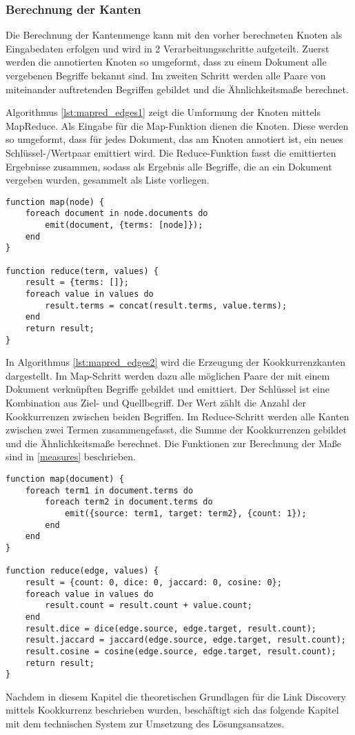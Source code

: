 \subsubsection{Berechnung der Kanten}

Die Berechnung der Kantenmenge kann mit den vorher berechneten Knoten als Eingabedaten erfolgen und wird in 2 Verarbeitungsschritte aufgeteilt. Zuerst werden die annotierten Knoten so umgeformt, dass zu einem Dokument alle vergebenen Begriffe bekannt sind. Im zweiten Schritt werden alle Paare von miteinander auftretenden Begriffen gebildet und die Ähnlichkeitsmaße berechnet.

Algorithmus \ref{lst:mapred_edges1} zeigt die Umformung der Knoten mittels MapReduce. Als Eingabe für die Map-Funktion dienen die Knoten. Diese werden so umgeformt, dass für jedes Dokument, das am Knoten annotiert ist, ein neues Schlüssel-/Wertpaar emittiert wird. Die Reduce-Funktion fasst die emittierten Ergebnisse zusammen, sodass als Ergebnis alle Begriffe, die an ein Dokument vergeben wurden, gesammelt als Liste vorliegen.

\begin{lstlisting}[language=pseudo, label={lst:mapred_edges1}, caption={Umformung der Knoten mit MapReduce}]
function map(node) {
    foreach document in node.documents do
        emit(document, {terms: [node]});
    end
}

function reduce(term, values) {
    result = {terms: []};
    foreach value in values do
        result.terms = concat(result.terms, value.terms);
    end
    return result;
}
\end{lstlisting}

In Algorithmus \ref{lst:mapred_edges2} wird die Erzeugung der Kookkurrenzkanten dargestellt. Im Map-Schritt werden dazu alle möglichen Paare der mit einem Dokument verknüpften Begriffe gebildet und emittiert. Der Schlüssel ist eine Kombination aus Ziel- und Quellbegriff. Der Wert zählt die Anzahl der Kookkurrenzen zwischen beiden Begriffen. Im Reduce-Schritt werden alle Kanten zwischen zwei Termen zusammengefasst, die Summe der Kookkurrenzen gebildet und die Ähnlichkeitsmaße berechnet. Die Funktionen zur Berechnung der Maße sind in \ref{measures} beschrieben.

\begin{lstlisting}[language=pseudo, label={lst:mapred_edges2}, caption={Kantenerzeugung mit MapReduce}]
function map(document) {
    foreach term1 in document.terms do
        foreach term2 in document.terms do
            emit({source: term1, target: term2}, {count: 1});
        end
    end
}

function reduce(edge, values) {
    result = {count: 0, dice: 0, jaccard: 0, cosine: 0};
    foreach value in values do
        result.count = result.count + value.count;
    end
    result.dice = dice(edge.source, edge.target, result.count);
    result.jaccard = jaccard(edge.source, edge.target, result.count);
    result.cosine = cosine(edge.source, edge.target, result.count);
    return result;
}
\end{lstlisting}

Nachdem in diesem Kapitel die theoretischen Grundlagen für die Link Discovery mittels Kookkurrenz beschrieben wurden, beschäftigt sich das folgende Kapitel mit dem technischen System zur Umsetzung des Lösungsansatzes.